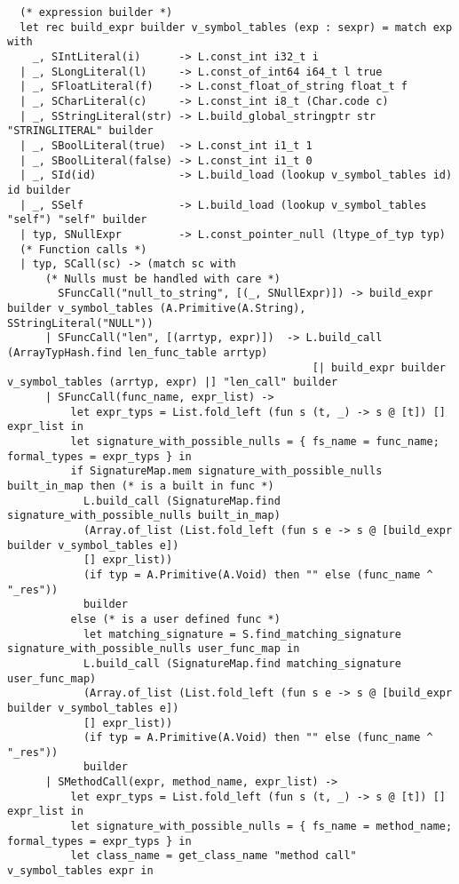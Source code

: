 \documentclass{article}
\begin{document}
\begin{verbatim}
  (* expression builder *)
  let rec build_expr builder v_symbol_tables (exp : sexpr) = match exp with
    _, SIntLiteral(i)      -> L.const_int i32_t i
  | _, SLongLiteral(l)     -> L.const_of_int64 i64_t l true
  | _, SFloatLiteral(f)    -> L.const_float_of_string float_t f
  | _, SCharLiteral(c)     -> L.const_int i8_t (Char.code c)
  | _, SStringLiteral(str) -> L.build_global_stringptr str "STRINGLITERAL" builder
  | _, SBoolLiteral(true)  -> L.const_int i1_t 1
  | _, SBoolLiteral(false) -> L.const_int i1_t 0
  | _, SId(id)             -> L.build_load (lookup v_symbol_tables id) id builder
  | _, SSelf               -> L.build_load (lookup v_symbol_tables "self") "self" builder
  | typ, SNullExpr         -> L.const_pointer_null (ltype_of_typ typ)
  (* Function calls *)
  | typ, SCall(sc) -> (match sc with
      (* Nulls must be handled with care *)
        SFuncCall("null_to_string", [(_, SNullExpr)]) -> build_expr builder v_symbol_tables (A.Primitive(A.String), SStringLiteral("NULL"))
      | SFuncCall("len", [(arrtyp, expr)])  -> L.build_call (ArrayTypHash.find len_func_table arrtyp) 
                                                [| build_expr builder v_symbol_tables (arrtyp, expr) |] "len_call" builder
      | SFuncCall(func_name, expr_list) ->
          let expr_typs = List.fold_left (fun s (t, _) -> s @ [t]) [] expr_list in
          let signature_with_possible_nulls = { fs_name = func_name; formal_types = expr_typs } in
          if SignatureMap.mem signature_with_possible_nulls built_in_map then (* is a built in func *)
            L.build_call (SignatureMap.find signature_with_possible_nulls built_in_map)
            (Array.of_list (List.fold_left (fun s e -> s @ [build_expr builder v_symbol_tables e])
            [] expr_list))
            (if typ = A.Primitive(A.Void) then "" else (func_name ^ "_res"))
            builder
          else (* is a user defined func *)
            let matching_signature = S.find_matching_signature signature_with_possible_nulls user_func_map in
            L.build_call (SignatureMap.find matching_signature user_func_map)
            (Array.of_list (List.fold_left (fun s e -> s @ [build_expr builder v_symbol_tables e])
            [] expr_list))
            (if typ = A.Primitive(A.Void) then "" else (func_name ^ "_res"))
            builder
      | SMethodCall(expr, method_name, expr_list) ->
          let expr_typs = List.fold_left (fun s (t, _) -> s @ [t]) [] expr_list in
          let signature_with_possible_nulls = { fs_name = method_name; formal_types = expr_typs } in
          let class_name = get_class_name "method call" v_symbol_tables expr in

\end{verbatim}
\end{document}
